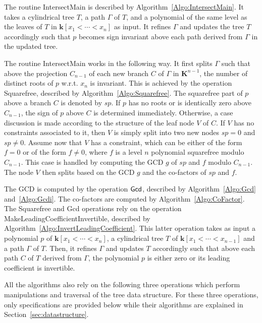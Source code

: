 \documentclass[10pt]{article}
\def\K {\ensuremath{\mathbf{k}}}
\def\KK {\ensuremath{\mathbf{K}}}
\begin{document}
The routine {\sf IntersectMain} is described by Algorithm~\ref{Algo:IntersectMain}.
It takes a cylindrical tree $T$, a path $\Gamma$ of $T$, 
and a polynomial of the same level as the leaves of $T$ in $\K[x_1<\cdots<x_n]$
as input. It refines $\Gamma$ and updates the tree $T$ accordingly such that 
$p$ becomes sign invariant above each path derived from $\Gamma$ 
in the updated tree.

The  routine {\sf IntersectMain} works in the following way.
It first splits $\Gamma$ such that 
above the projection $C_{n-1}$ of each new branch $C$ of $\Gamma$ in $\KK^{n-1}$, 
the number of distinct roots of $p$ w.r.t. $x_n$ is invariant.
This is achieved by the operation {\sf Squarefree}, 
described by Algorithm~\ref{Algo:Squarefree}.
The squarefree part of $p$ above a branch $C$ 
is denoted by $sp$.
If $p$ has no roots or is identically zero above $C_{n-1}$,
the sign of $p$ above $C$ is determined immediately. 
Otherwise, a case discussion is made according to 
the structure of the leaf node $V$ of $C$.
If $V$ has no constraints associated to it, 
then $V$ is simply split into two new nodes $sp=0$ and $sp\neq 0$.
Assume now that $V$ has a constraint, which can
be either of the form $f=0$ or of the form $f\neq 0$, 
where $f$ is a level $n$ polynomial squarefree modulo $C_{n-1}$.
This case is handled by computing the GCD $g$ of $sp$ and $f$ modulo $C_{n-1}$.
The node $V$ then splits based on the GCD $g$ and the co-factors of $sp$ and $f$.

The GCD is computed by the operation ${\sf Gcd}$, 
described by Algorithm~\ref{Algo:Gcd} and~\ref{Algo:Gcdi}.
The co-factors are computed by Algorithm~\ref{Algo:CoFactor}.
The {\sf Squarefree} and {\sf Gcd} operations
rely on the operation {\sf MakeLeadingCoefficientInvertible},
described by Algorithm~\ref{Algo:InvertLeadingCoefficient}.
This latter operation takes as input a polynomial $p$ of $\K[x_1<\cdots<x_n]$,
a cylindrical tree $T$ of $\K[x_1<\cdots<x_{n-1}]$
and a path $\Gamma$ of $T$.
Then, it refines $\Gamma$ and updates $T$ accordingly such that
above each path $C$ of $T$ derived from $\Gamma$, 
the polynomial $p$ is either zero or its leading coefficient is invertible.

All the algorithms also rely on the following three operations 
which perform manipulations and traversal of the tree data structure. 
For these three operations, only specifications are provided below
while their algorithms are explained in Section~\ref{sec:datastructure}.
\end{document}
